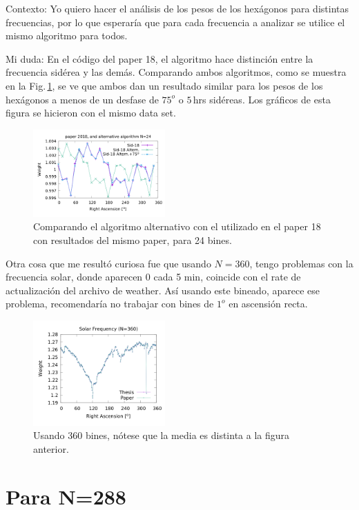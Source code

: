 Contexto: Yo quiero hacer el análisis de los pesos de los hexágonos para distintas frecuencias, por lo que esperaría que para cada frecuencia a analizar se utilice el mismo algoritmo para todos.

Mi duda: En el código del paper 18, el algoritmo hace distinción entre la frecuencia sidérea y las demás. Comparando ambos algoritmos, como se muestra en la Fig.\,\ref{fig:alter_24}, se ve que ambos dan un resultado similar para los pesos de los hexágonos a menos de un desfase de $75^o$ o $5\,$hrs sidéreas. Los gráficos de esta figura se hicieron con el mismo data set.

\begin{figure}[H]
	\centering
	\includegraphics[width=0.45\textwidth]{sidereal_paper_in_24_w_alter.png}
	\caption{Comparando el algoritmo alternativo con el utilizado en el paper 18 con resultados del mismo paper, para 24 bines.}
	\label{fig:alter_24}
\end{figure}


Otra cosa que me resultó curiosa fue que usando $N=360$, tengo problemas con la frecuencia solar, donde aparecen 0 cada 5 min, coincide con el rate de actualización del archivo de weather. Así usando este bineado, aparece ese problema, recomendaría no trabajar con bines de $1^o$ en ascensión recta.
\begin{figure}[H]
	\centering
	\includegraphics[width=0.45\textwidth]{solar_my_and_paper_in_360_2.png}
	\caption{Usando 360 bines, nótese que la media es distinta a la figura anterior.}
	\label{fig:solar_360}
\end{figure}

\section{Para N=288}

